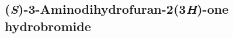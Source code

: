 {{{{{{{{{{%
%
%
%
%

\subsection{(\textit{S})-3-Aminodihydrofuran-2(3\textit{H})-one hydrobromide }


}}}}}}}}}}
